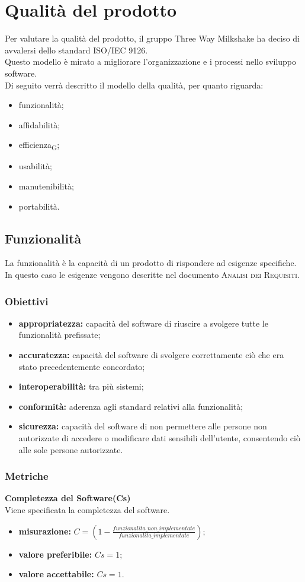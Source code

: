 \section{Qualità del prodotto}
Per valutare  la qualità del prodotto, il gruppo Three Way Milkshake ha deciso di avvalersi dello standard ISO/IEC 9126.\\
Questo modello è mirato a  migliorare l'organizzazione e i processi nello sviluppo software.\\
Di seguito verrà descritto il modello della qualità, per quanto riguarda:
\begin{itemize}
	\item funzionalità;
	\item affidabilità;
	\item \gls{efficienza}\textsubscript{G};
	\item usabilità;
	\item manutenibilità;
	\item portabilità.
\end{itemize}

\subsection{Funzionalità}
La funzionalità è la capacità di un prodotto di rispondere ad esigenze specifiche.\\
In questo caso le esigenze vengono descritte nel documento \textsc{Analisi dei Requisiti}.
\subsubsection{Obiettivi}
\begin{itemize}
	\item \textbf{appropriatezza:} capacità del software di riuscire a svolgere tutte le funzionalità prefissate;
	\item \textbf{accuratezza:} capacità del software di svolgere correttamente ciò che era stato precedentemente concordato;
	\item \textbf{interoperabilità:} tra più sistemi;
	\item \textbf{conformità:} aderenza agli standard relativi alla funzionalità;
	\item \textbf{sicurezza:} capacità del software di non permettere alle persone non autorizzate di accedere o modificare dati sensibili dell'utente, consentendo ciò alle sole persone autorizzate.
\end{itemize}

\subsubsection{Metriche}
\textbf{Completezza del Software(Cs)}\\
Viene specificata la completezza del software.
\begin{itemize}
	\item \textbf{misurazione:} $C = (1- \frac{funzionalita\_non\_implementate }{funzionalita\_implementate})$;
	\item \textbf{valore preferibile:} $Cs = 1$;
	\item \textbf{valore accettabile:} $Cs = 1$.
\end{itemize}
\pagebreak

